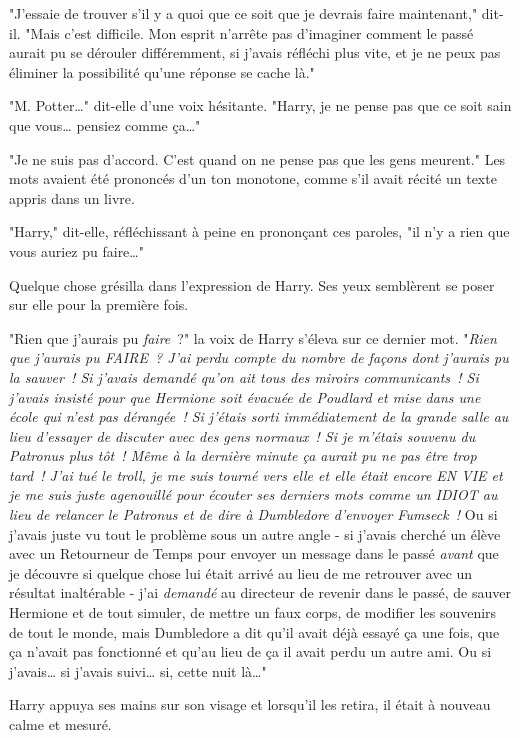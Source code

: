 "J'essaie de trouver s'il y a quoi que ce soit que je devrais faire maintenant," dit-il. "Mais c'est difficile. Mon esprit n'arrête pas d'imaginer comment le passé aurait pu se dérouler différemment, si j'avais réfléchi plus vite, et je ne peux pas éliminer la possibilité qu'une réponse se cache là."

"M. Potter…" dit-elle d'une voix hésitante. "Harry, je ne pense pas que ce soit sain que vous… pensiez comme ça…"

"Je ne suis pas d'accord. C'est quand on ne pense pas que les gens meurent." Les mots avaient été prononcés d'un ton monotone, comme s'il avait récité un texte appris dans un livre.

"Harry," dit-elle, réfléchissant à peine en prononçant ces paroles, "il n'y a rien que vous auriez pu faire…"

Quelque chose grésilla dans l'expression de Harry. Ses yeux semblèrent se poser sur elle pour la première fois.

"Rien que j'aurais pu \emph{faire}~?" la voix de Harry s'éleva sur ce dernier mot. "\emph{Rien que j'aurais pu FAIRE~? J'ai perdu compte du nombre de façons dont j'aurais pu la sauver~! Si j'avais demandé qu'on ait tous des miroirs communicants~! Si j'avais insisté pour que Hermione soit évacuée de Poudlard et mise dans une école qui n'est pas dérangée~! Si j'étais sorti immédiatement de la grande salle au lieu d'essayer de discuter avec des gens normaux~! Si je m'étais souvenu du Patronus plus tôt~! Même à la dernière minute ça aurait pu ne pas être trop tard~! J'ai tué le troll, je me suis tourné vers elle et elle était encore EN VIE et je me suis juste agenouillé pour écouter ses derniers mots comme un IDIOT au lieu de relancer le Patronus et de dire à Dumbledore d'envoyer Fumseck~!} Ou si j'avais juste vu tout le problème sous un autre angle - si j'avais cherché un élève avec un Retourneur de Temps pour envoyer un message dans le passé \emph{avant} que je découvre si quelque chose lui était arrivé au lieu de me retrouver avec un résultat inaltérable - j'ai \emph{demandé} au directeur de revenir dans le passé, de sauver Hermione et de tout simuler, de mettre un faux corps, de modifier les souvenirs de tout le monde, mais Dumbledore a dit qu'il avait déjà essayé ça une fois, que ça n'avait pas fonctionné et qu'au lieu de ça il avait perdu un autre ami. Ou si j'avais… si j'avais suivi… si, cette nuit là…"

Harry appuya ses mains sur son visage et lorsqu'il les retira, il était à nouveau calme et mesuré.


